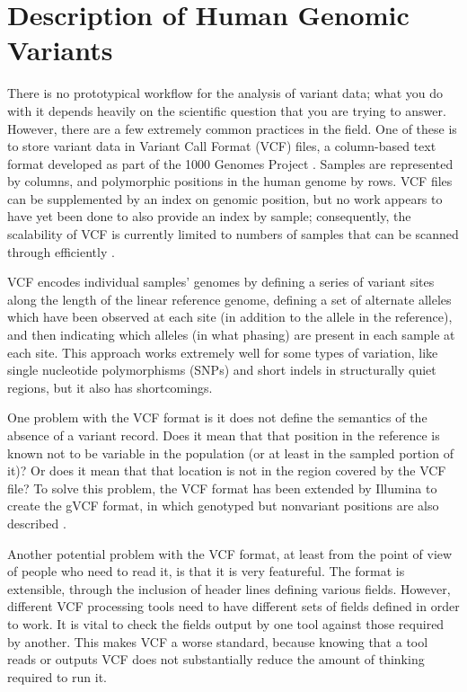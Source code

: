 \documentclass[11pt,proposal]{ucthesis}
\begin{document}
    
\section{Description of Human Genomic Variants}

There is no prototypical workflow for the analysis of variant data; what you do with it depends heavily on the scientific question that you are trying to answer. However, there are a few extremely common practices in the field. One of these is to store variant data in Variant Call Format (VCF) files, a column-based text format developed as part of the 1000 Genomes Project \cite{danecek2011variant}. Samples are represented by columns, and polymorphic positions in the human genome by rows. VCF files can be supplemented by an index on genomic position, but no work appears to have yet been done to also provide an index by sample; consequently, the scalability of VCF is currently limited to numbers of samples that can be scanned through efficiently \cite{danecek2011variant}.

VCF encodes individual samples' genomes by defining a series of variant sites along the length of the linear reference genome, defining a set of alternate alleles which have been observed at each site (in addition to the allele in the reference), and then indicating which alleles (in what phasing) are present in each sample at each site. This approach works extremely well for some types of variation, like single nucleotide polymorphisms (SNPs) and short indels in structurally quiet regions, but it also has shortcomings.

One problem with the VCF format is it does not define the semantics of the absence of a variant record. Does it mean that that position in the reference is known not to be variable in the population (or at least in the sampled portion of it)? Or does it mean that that location is not in the region covered by the VCF file? To solve this problem, the VCF format has been extended by Illumina to create the gVCF format, in which genotyped but nonvariant positions are also described \cite{saunders2014about}.

Another potential problem with the VCF format, at least from the point of view of people who need to read it, is that it is very featureful. The format is extensible, through the inclusion of header lines defining various fields. However, different VCF processing tools need to have different sets of fields defined in order to work. It is vital to check the fields output by one tool against those required by another. This makes VCF a worse standard, because knowing that a tool reads or outputs VCF does not substantially reduce the amount of thinking required to run it.
\end{document}
